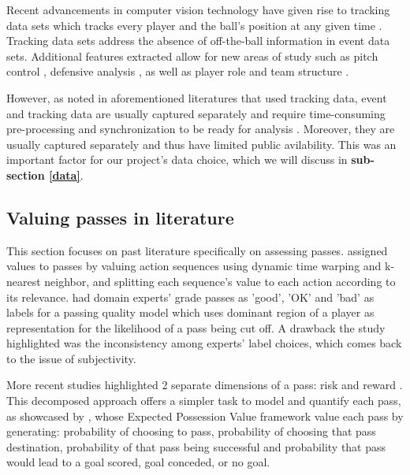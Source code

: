 \documentclass[conference]{IEEEtran}
\begin{document}
Recent advancements in computer vision technology have given rise to tracking data sets which tracks every player and the ball’s position at any given time \parencite{xPass2022}. Tracking data sets address the absence of off-the-ball information in event data sets. Additional features extracted allow for new areas of study such as pitch control \parencite{Fernandez2018}, defensive analysis \parencite{counterpressing, GNNPaulPower}, as well as player role \parencite{Bialkowski2014} and team structure \parencite{Bialkowski2016}. 

However, as noted in aforementioned literatures that used tracking data, event and tracking data are usually captured separately and require time-consuming pre-processing and synchronization to be ready for analysis \parencite{Fernandez2018, xPass2022, goesriskreward}. Moreover, they are usually captured separately and thus have limited public avilability. This was an important factor for our project's data choice, which we will discuss in \textbf{sub-section \ref{data}}.







\subsection{Valuing passes in literature}\label{lit}

This section focuses on past literature specifically on assessing passes. \textcite{decroos2017starss} assigned values to passes by valuing action sequences using dynamic time warping and k-nearest neighbor, and splitting each sequence's value to each action according to its relevance. \textcite{horton} had domain experts' grade passes as 'good', 'OK' and 'bad' as labels for a passing quality model which uses dominant region of a player as representation for the likelihood of a pass being cut off. A drawback the study highlighted was the inconsistency among experts' label choices, which comes back to the issue of subjectivity. 

More recent studies highlighted 2 separate dimensions of a pass: risk and reward \parencite{riskrewardpower, goesriskreward}. This decomposed approach offers a simpler task to model and quantify each pass, as showcased by \textcite{fernandez2019decomposing}, whose Expected Possession Value framework value each pass by generating: probability of choosing to pass, probability of choosing that pass destination, probability of that pass being successful and probability that pass would lead to a goal scored, goal conceded, or no goal. 
\end{document}
